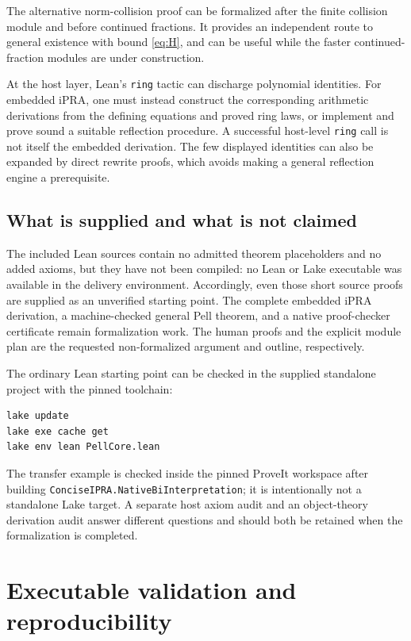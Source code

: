 \documentclass[11pt,letterpaper]{article}
\theoremstyle{definition}
\newcommand{\code}[1]{\texttt{#1}}
\begin{document}
The alternative norm-collision proof can be formalized after the finite
collision module and before continued fractions. It provides an independent
route to general existence with bound \eqref{eq:H}, and can be useful while
the faster continued-fraction modules are under construction.

At the host layer, Lean's \code{ring} tactic can discharge polynomial
identities. For embedded iPRA, one must instead construct the corresponding
arithmetic derivations from the defining equations and proved ring laws,
or implement and prove sound a suitable reflection procedure. A successful
host-level \code{ring} call is not itself the embedded derivation. The
few displayed identities can also be expanded by direct rewrite proofs,
which avoids making a general reflection engine a prerequisite.

\subsection{What is supplied and what is not claimed}

The included Lean sources contain no admitted theorem placeholders and no
added axioms, but they have not been compiled: no Lean or Lake executable
was available in the delivery environment. Accordingly, even those short
source proofs are supplied as an unverified starting point. The complete
embedded iPRA derivation, a machine-checked general Pell theorem, and a
native proof-checker certificate remain formalization work. The human
proofs and the explicit module plan are the requested non-formalized
argument and outline, respectively.

The ordinary Lean starting point can be checked in the supplied standalone
project with the pinned toolchain:
\begin{lstlisting}
lake update
lake exe cache get
lake env lean PellCore.lean
\end{lstlisting}
The transfer example is checked inside the pinned ProveIt workspace after
building \code{ConciseIPRA.NativeBiInterpretation}; it is intentionally not
a standalone Lake target. A separate host axiom audit and an object-theory
derivation audit answer different questions and should both be retained
when the formalization is completed.

\section{Executable validation and reproducibility}\label{sec:validation}
\end{document}
